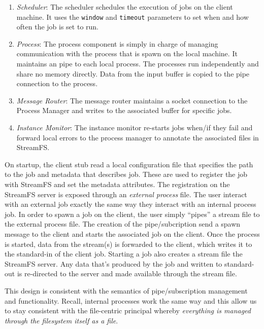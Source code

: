 \begin{enumerate}
\item \emph{Scheduler}: The scheduler schedules the execution of jobs on the client machine.  It uses the \texttt{window} and
						\texttt{timeout} parameters to set when and how often the job is set to run.
\item \emph{Process}:  The process component is simply in charge of managing communication with the process that is spawn
						on the local machine.  It maintains an pipe to each local process.  The processes
						run independently and share no memory directly.  Data from the input buffer is copied to the 
						pipe connection to the process.
\item \emph{Message Router}: The message router maintains a socket connection to the Process Manager and writes to the associated
								buffer for specific jobs.
\item \emph{Instance Monitor}: The instance monitor re-starts jobs when/if they fail and forward local errors to the process manager
								to annotate the associated files in StreamFS.
\end{enumerate}

On startup, the client stub read a local configuration file that specifies the path to the job and metadata that describes
job.  These are used to register the job with StreamFS and set the metadata attributes.  The registration on the StreamFS 
server is exposed through an \emph{external process} file.  The user interact with an external job exactly the same way they
interact with an internal process job.  In order to spawn a job on the client, the user simply ``pipes'' a stream file 
to the external process file.  The creation of the pipe/subcription send a spawn message to the client and starts the associated
job on the client.  Once the process is started, data from the stream(s) is forwarded to the client, which writes it to the 
standard-in of the client job.  Starting a job also creates a stream file the StreamFS server.  Any data that's produced by the job
and written to standard-out is re-directed to the server and made available through the stream file.

This design is consistent with the semantics of pipe/subscription management and functionality.  Recall, internal processes
work the same way and this allow us to stay consistent with the file-centric principal whereby \emph{everything is managed
through the filesystem itself as a file}.

